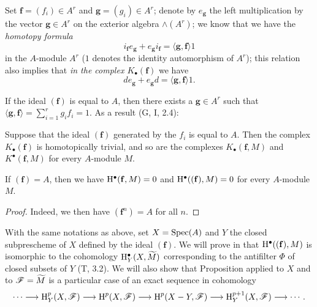 \begin{env}[1.1.7]
\label{3.1.1.7}
Set $\mathbf{f}=(f_i)\in A^r$ and $\mathbf{g}=(g_i)\in A^r$; denote by $e_\mathbf{g}$ the left multiplication by the vector $\mathbf{g}\in A^r$ on the exterior algebra $\wedge(A^r)$; we know that we have the \emph{homotopy formula}
\[
  i_\mathbf{f}e_\mathbf{g}+e_\mathbf{g}i_\mathbf{f}=\langle\mathbf{g},\mathbf{f}\rangle 1
  \tag{1.1.7.1}
\]
in the $A$-module $A^r$ ($1$ denotes the identity automorphism of $A^r$); this relation also implies that \emph{in the complex $K_\bullet(\mathbf{f})$} we have
\[
  de_\mathbf{g}+e_\mathbf{g}d=\langle\mathbf{g},\mathbf{f}\rangle 1.
  \tag{1.1.7.2}
\]

If the ideal $(\mathbf{f})$ is equal to $A$, then there exists a $\mathbf{g}\in A^r$ such that $\langle\mathbf{g},\mathbf{f}\rangle=\sum_{i=1}^r g_i f_i=1$.
As a result (G, I, 2.4):
\end{env}

\begin{proposition}[1.1.8]
\label{3.1.1.8}
Suppose that the ideal $(\mathbf{f})$ generated by the $f_i$ is equal to $A$.
Then the complex $K_\bullet(\mathbf{f})$ is homotopically trivial, and so are the complexes $K_\bullet(\mathbf{f},M)$ and $K^\bullet(\mathbf{f},M)$ for every $A$-module $M$.
\end{proposition}

\begin{corollary}[1.1.9]
\label{3.1.1.9}
If $(\mathbf{f})=A$, then we have $\mathrm{H}^\bullet(\mathbf{f},M)=0$ and $\mathrm{H}^\bullet((\mathbf{f}),M)=0$ for every $A$-module $M$.
\end{corollary}

\begin{proof}
\label{proof-3.1.1.9}
Indeed, we then have $(\mathbf{f}^n)=A$ for all $n$.
\end{proof}

\begin{remark}[1.1.10]
\label{3.1.1.10}
With the same notations as above, set $X=\operatorname{Spec}(A)$ and $Y$ the closed subprescheme of $X$ defined by the ideal $(\mathbf{f})$.
We will prove in  that $\mathrm{H}^\bullet((\mathbf{f}),M)$ is isomorphic to the cohomology $\mathrm{H}_Y^\bullet(X,\widetilde{M})$ corresponding to the antifilter $\Phi$ of closed subsets of $Y$ (T, 3.2).
We will also show that Proposition  applied to $X$ and to $\mathscr{F}=\widetilde{M}$ is a particular case of an exact sequence in cohomology
\[
  \cdots\to\HH_Y^p(X,\sh{F})\to\HH^p(X,\sh{F})\to\HH^p(X\setmin Y,\sh{F})\to\HH_Y^{p+1}(X,\sh{F})\to\cdots.
\]
\end{remark}

